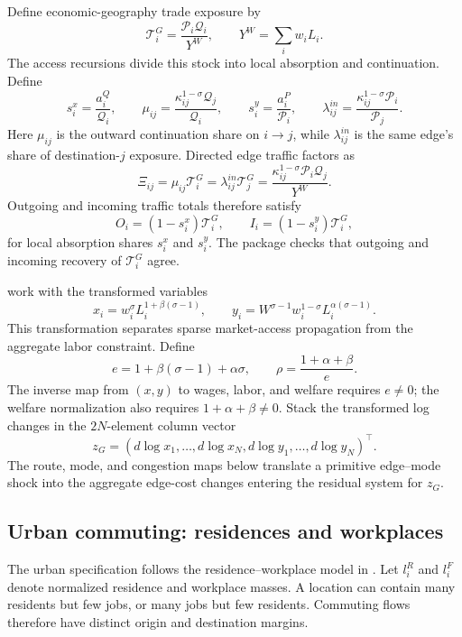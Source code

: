 Define economic-geography trade exposure by
\[
  \mathcal T_i^G=\frac{\mathcal P_i\mathcal Q_i}{Y^W},
  \qquad
  Y^W=\sum_i w_iL_i.
\]
The access recursions divide this stock into local absorption and continuation.
Define
\[
 s_i^x=\frac{a_i^Q}{\mathcal Q_i},\qquad
 \mu_{ij}=\frac{\kappa_{ij}^{1-\sigma}\mathcal Q_j}{\mathcal Q_i},
 \qquad
 s_i^y=\frac{a_i^P}{\mathcal P_i},\qquad
 \lambda^{in}_{ij}
 =\frac{\kappa_{ij}^{1-\sigma}\mathcal P_i}{\mathcal P_j}.
\]
Here \(\mu_{ij}\) is the outward continuation share on \(i\to j\), while
\(\lambda^{in}_{ij}\) is the same edge's share of destination-\(j\) exposure.
Directed edge traffic factors as
\[
  \Xi_{ij}=\mu_{ij}\mathcal T_i^G
          =\lambda^{in}_{ij}\mathcal T_j^G
          =\frac{\kappa_{ij}^{1-\sigma}
                  \mathcal P_i\mathcal Q_j}{Y^W}.
\]
Outgoing and incoming traffic totals therefore satisfy
\[
 O_i=(1-s_i^x)\mathcal T_i^G,
 \qquad
 I_i=(1-s_i^y)\mathcal T_i^G,
\]
for local absorption shares \(s_i^x\) and \(s_i^y\). The package checks
that outgoing and incoming recovery of \(\mathcal T_i^G\) agree.

\citet[Appendix A]{AllenFuchsWong2026} work with the transformed variables
\[
 x_i=w_i^\sigma L_i^{1+\beta(\sigma-1)},\qquad
 y_i=W^{\sigma-1}w_i^{1-\sigma}L_i^{\alpha(\sigma-1)}.
\]
This transformation separates sparse market-access propagation from the
aggregate labor constraint. Define
\[
 e=1+\beta(\sigma-1)+\alpha\sigma,
 \qquad
 \rho=\frac{1+\alpha+\beta}{e}.
\]
The inverse map from \((x,y)\) to wages, labor, and welfare requires
\(e\neq0\); the welfare normalization also requires
\(1+\alpha+\beta\neq0\).
Stack the transformed log changes in the \(2N\)-element column vector
\[
 z_G=(d\log x_1,\ldots,d\log x_N,
      d\log y_1,\ldots,d\log y_N)^\top.
\]
The route, mode, and congestion maps below translate a primitive edge--mode
shock into the aggregate edge-cost changes entering the residual system for
\(z_G\).


\subsection{Urban commuting: residences and workplaces}

The urban specification follows the residence--workplace model in
\citet{AA_2022restud}. Let \(l_i^R\) and \(l_i^F\) denote normalized residence
and workplace masses. A location can contain many residents but few jobs, or
many jobs but few residents. Commuting flows therefore have distinct origin
and destination margins.

